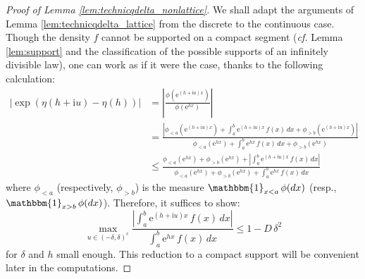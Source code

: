 \documentclass[12pt,a4paper,reqno]{amsart}
\theoremstyle{remark}
\newcommand{\E}{\mathrm{e}}
\newcommand{\I}{\mathrm{i}}
\begin{document}
\begin{proof}[Proof of Lemma \ref{lem:technicqdelta_nonlattice}]
We shall adapt the arguments of Lemma \ref{lem:technicqdelta_lattice} from the discrete to the continuous case. Though the density $f$ cannot be supported on a compact segment (\emph{cf.} Lemma \ref{lem:support} and the classification of the possible supports of an infinitely divisible law), one can work as if it were the case, thanks to the following calculation:
\begin{align*}
|\exp(\eta(h+\I u)-\eta(h))|&=\left|\frac{\phi(\E^{(h+\I u)x})}{\phi(\E^{hx})}\right|\\
&=\frac{|\phi_{<a}(\E^{(h+\I u)x})+\int_a^b \E^{(h+\I u) x}\,f(x)\,dx+\phi_{>b}(\E^{(h+\I u)x})|}{\phi_{<a}(\E^{hx})+\int_a^b \E^{hx}\,f(x)\,dx+\phi_{>b}(\E^{hx})}\\
&\leq \frac{\phi_{<a}(\E^{hx})+\phi_{>b}(\E^{hx})+|\int_a^b \E^{(h+\I u) x}\,f(x)\,dx|}{\phi_{<a}(\E^{hx})+\phi_{>b}(\E^{hx})+\int_a^b \E^{hx}\,f(x)\,dx}
\end{align*}
where $\phi_{<a}$ (respectively, $\phi_{>b}$) is the measure $\mathbbm{1}_{x<a}\,\phi(dx)$ (resp., $\mathbbm{1}_{x>b}\,\phi(dx)$). Therefore, it suffices to show:
$$\max_{u \in (-\delta,\delta)^\mathrm{c}} \frac{|\int_a^b \E^{(h+\I u)x}\,f(x)\,dx|}{\int_a^b \E^{hx}\,f(x)\,dx} \leq 1-D\,\delta^2$$
for $\delta$ and $h$ small enough. This reduction to a compact support will be convenient later in the computations.\bigskip


\end{proof}
\end{document}
